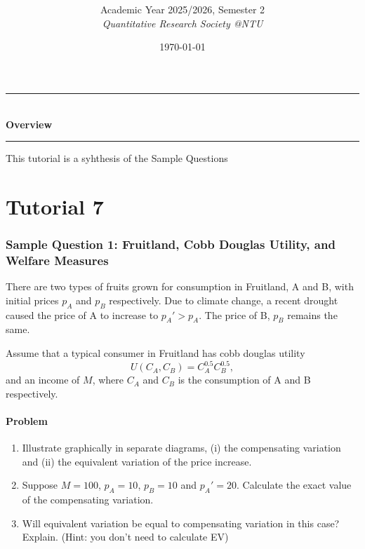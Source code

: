 \documentclass[12pt]{article}
\title{
\CourseCode \CourseName \\[0.3em]
\large \DocType
}
\author{
  Academic Year 2025/2026, Semester 2 \\[0.25em]
  \textit{Quantitative Research Society @NTU}
}
\date{\today}
\begin{document}
\maketitle
\thispagestyle{plainfirst}
\pagestyle{main}
\bigskip

\begin{center}
  \rule{0.8\textwidth}{0.4pt}\\[4pt]
  \textbf{Overview}\\[2pt]
  \rule{0.8\textwidth}{0.4pt}
\end{center}

\noindent
This tutorial is a syhthesis of the Sample Questions

\bigskip

\newpage
\tableofcontents

\newpage
\part{Tutorial 7}

\section{Sample Question 1: Fruitland, Cobb Douglas Utility, and Welfare Measures}

\noindent
There are two types of fruits grown for consumption in Fruitland, A and B, with initial prices \(p_A\) and \(p_B\) respectively. Due to climate change, a recent drought caused the price of A to increase to \(p_A' > p_A\). The price of B, \(p_B\) remains the same.

\medskip

\noindent
Assume that a typical consumer in Fruitland has cobb douglas utility
\[
U(C_A,C_B)=C_A^{0.5}C_B^{0.5},
\]
and an income of \(M\), where \(C_A\) and \(C_B\) is the consumption of A and B respectively.

\subsection{Problem}
\begin{enumerate}[label=(\alph*)]
    \item Illustrate graphically in separate diagrams, (i) the compensating variation and (ii) the equivalent variation of the price increase.
    \item Suppose \(M=100\), \(p_A=10\), \(p_B=10\) and \(p_A'=20\). Calculate the exact value of the compensating variation.
    \item Will equivalent variation be equal to compensating variation in this case? Explain. (Hint: you don’t need to calculate EV)
\end{enumerate}
\end{document}
